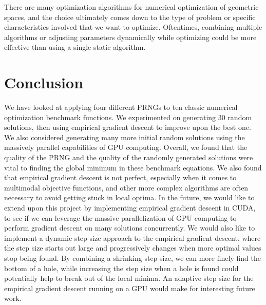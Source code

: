 \documentclass{article}
\begin{document}
There are many optimization algorithms for numerical optimization of geometric spaces, and the choice ultimately comes down to the type of problem or specific characteristics involved that we want to optimize. Oftentimes, combining multiple algorithms or adjusting parameters dynamically while optimizing could be more effective than using a single static algorithm.
\pagebreak
    \section{Conclusion}
We have looked at applying four different PRNGs to ten classic numerical optimization benchmark functions. We experimented on generating 30 random solutions, then using empirical gradient descent to improve upon the best one. We also considered generating many more initial random solutions using the massively parallel capabilities of GPU computing. Overall, we found that the quality of the PRNG and the quality of the randomly generated solutions were vital to finding the global minimum in these benchmark equations. We also found that empirical gradient descent is not perfect, especially when it comes to multimodal objective functions, and other more complex algorithms are often necessary to avoid getting stuck in local optima. In the future, we would like to extend upon this project by implementing empirical gradient descent in CUDA, to see if we can leverage the massive parallelization of GPU computing to perform gradient descent on many solutions concurrently. We would also like to implement a dynamic step size approach to the empirical gradient descent, where the step size starts out large and progressively changes when more optimal values stop being found. By combining a shrinking step size, we can more finely find the bottom of a hole, while increasing the step size when a hole is found could potentially help to break out of the local minima. An adaptive step size for the empirical gradient descent running on a GPU would make for interesting future work. 
\pagebreak
\nocite*{}

\end{document}
